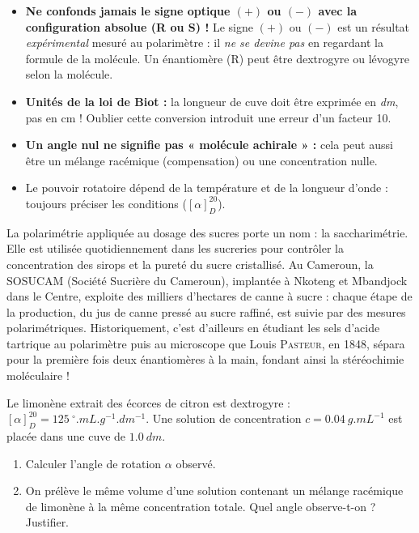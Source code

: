 \documentclass[11pt]{article}
\providecommand{\degree}{^{\circ}}
\newcommand{\cle}[1]{{\popxbold\color{popdark}#1}}
\begin{document}
\begin{attention}
\begin{itemize}
\item \textbf{Ne confonds jamais le signe optique $(+)$ ou $(-)$ avec la configuration absolue (R ou S) !} Le signe $(+)$ ou $(-)$ est un résultat \emph{expérimental} mesuré au polarimètre : il \emph{ne se devine pas} en regardant la formule de la molécule. Un énantiomère (R) peut être dextrogyre ou lévogyre selon la molécule.
\item \textbf{Unités de la loi de Biot :} la longueur de cuve doit être exprimée en \emph{dm}, pas en cm ! Oublier cette conversion introduit une erreur d'un facteur 10.
\item \textbf{Un angle nul ne signifie pas « molécule achirale » :} cela peut aussi être un mélange racémique (compensation) ou une concentration nulle.
\item Le pouvoir rotatoire dépend de la température et de la longueur d'onde : toujours préciser les conditions ($[\alpha]_D^{20}$).
\end{itemize}
\end{attention}

\begin{savaistu}
La polarimétrie appliquée au dosage des sucres porte un nom : la \cle{saccharimétrie}. Elle est utilisée quotidiennement dans les sucreries pour contrôler la concentration des sirops et la pureté du sucre cristallisé. Au Cameroun, la SOSUCAM (Société Sucrière du Cameroun), implantée à Nkoteng et Mbandjock dans le Centre, exploite des milliers d'hectares de canne à sucre : chaque étape de la production, du jus de canne pressé au sucre raffiné, est suivie par des mesures polarimétriques. Historiquement, c'est d'ailleurs en étudiant les sels d'acide tartrique au polarimètre puis au microscope que Louis \textsc{Pasteur}, en 1848, sépara pour la première fois deux énantiomères à la main, fondant ainsi la stéréochimie moléculaire !
\end{savaistu}

\begin{exercice}
Le limonène extrait des écorces de citron est dextrogyre : $[\alpha]_D^{20} = \SI{+125}{\degree.mL.g^{-1}.dm^{-1}}$. Une solution de concentration $c = \SI{0,04}{g.mL^{-1}}$ est placée dans une cuve de $\SI{1,0}{dm}$.
\begin{enumerate}
\item Calculer l'angle de rotation $\alpha$ observé.
\item On prélève le même volume d'une solution contenant un mélange racémique de limonène à la même concentration totale. Quel angle observe-t-on ? Justifier.
\end{enumerate}
\end{exercice}
\end{document}
